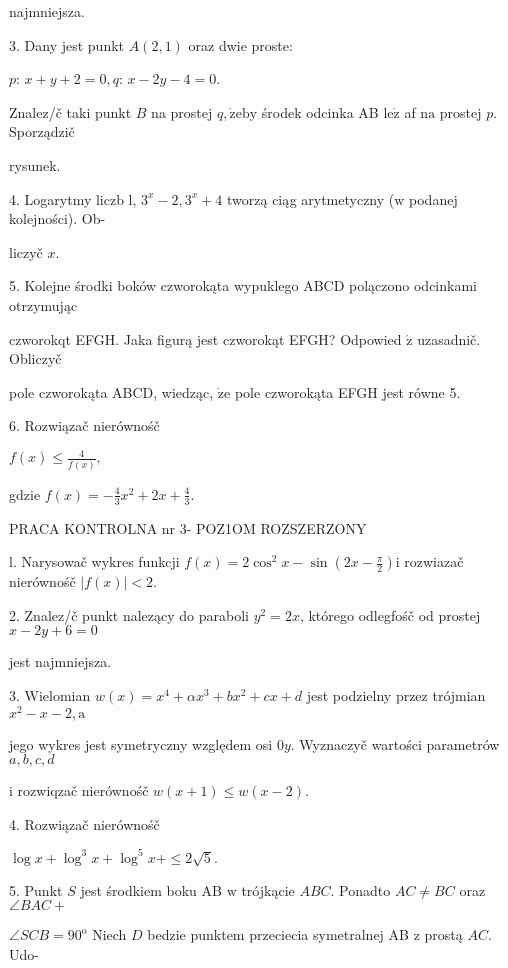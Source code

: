 \documentclass[a4paper,12pt]{article}
\begin{document}
najmniejsza.

3. Dany jest punkt $A(2,1)$ oraz dwie proste:

$p$: $x+y+2=0, q$: $x-2y-4=0.$

Znalez/č taki punkt $B$ na prostej $q, \dot{\mathrm{z}}\mathrm{e}\mathrm{b}\mathrm{y}$ środek odcinka AB $\mathrm{l}\mathrm{e}\dot{\mathrm{z}}$ af $\mathrm{n}\mathrm{a}$ prostej $p$. Sporządzič

rysunek.

4. Logarytmy liczb l, $3^{x}-2, 3^{x}+4$ tworzą ciąg arytmetyczny ($\mathrm{w}$ podanej kolejności). Ob-

liczyč $x.$

5. Kolejne środki boków czworokąta wypuklego ABCD polączono odcinkami otrzymując

czworokqt EFGH. Jaka figurą jest czworokąt EFGH? Odpowied $\acute{\mathrm{z}}$ uzasadnič. Obliczyč

pole czworokąta ABCD, wiedząc, $\dot{\mathrm{z}}\mathrm{e}$ pole czworokąta EFGH jest równe 5.

6. Rozwiązač nierównośč

$f(x)\displaystyle \leq\frac{4}{f(x)},$

gdzie $f(x)=-\displaystyle \frac{4}{3}x^{2}+2x+\frac{4}{3}.$




PRACA KONTROLNA nr 3- POZ1OM ROZSZERZONY

l. Narysowač wykres funkcji $f(x)=2\displaystyle \cos^{2}x-\sin(2x-\frac{\pi}{2})\mathrm{i}$ rozwiazač nierównośč $|f(x)|<2.$

2. Znalez/č punkt nalezący do paraboli $y^{2}=2x$, którego odlegfośč od prostej $x-2y+6=0$

jest najmniejsza.

3. Wielomian $w(x)=x^{4}+\alpha x^{3}+bx^{2}+cx+d$ jest podzielny przez trójmian $x^{2}-x-2, \mathrm{a}$

jego wykres jest symetryczny względem osi $0y$. Wyznaczyč wartości parametrów $a, b, c, d$

$\mathrm{i}$ rozwiqzač nierównośč $w(x+1)\leq w(x-2).$

4. Rozwiązač nierównośč

$\log x+\log^{3}x+\log^{5}x+\leq 2\sqrt{5}.$

5. Punkt $S$ jest środkiem boku AB $\mathrm{w}$ trójkącie $ABC$. Ponadto $AC\neq BC$ oraz $\angle BAC+$

$\angle SCB=90^{\mathrm{o}}$ Niech $D$ bedzie punktem przeciecia symetralnej AB $\mathrm{z}$ prostą $AC$. Udo-
\end{document}
